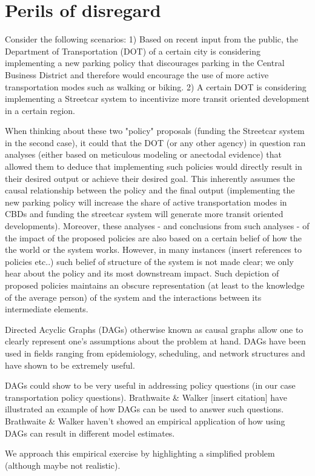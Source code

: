 \section{Perils of disregard}
Consider the following scenarios: 1) Based on recent input from the public, the Department of Transportation (DOT) of a certain city is considering implementing a new parking policy that discourages parking in the Central Business District and therefore would encourage the use of more active transportation modes such as walking or biking.
2) A certain DOT is considering implementing a Streetcar system to incentivize more transit oriented development in a certain region. 

When thinking about these two "policy" proposals (funding the Streetcar system in the second case), it could that the DOT (or any other agency) in question ran analyses (either based on meticulous modeling or anectodal evidence) that allowed them to deduce that implementing such policies would directly result in their desired output or achieve their desired goal.
This inherently assumes the causal relationship between the policy and the final output (implementing the new parking policy will increase the share of active transportation modes in CBDs and funding the streetcar system will generate more transit oriented developments).
Moreover, these analyses - and conclusions from such analyses - of the impact of the proposed policies are also based on a certain belief of how the the world or the system works. 
However, in many instances (insert references to policies etc..) such belief of structure of the system is not made clear; we only hear about the policy and its most downstream impact. 
Such depiction of proposed policies maintains an obscure representation (at least to the knowledge of the average person) of the system and the interactions between its intermediate elements.

Directed Acyclic Graphs (DAGs) otherwise known as causal graphs allow one to clearly represent one's assumptions about the problem at hand.
DAGs have been used in fields ranging from epidemiology, scheduling, and network structures and have shown to be extremely useful. 

DAGs could show to be very useful in addressing policy questions (in our case transportation policy questions).
Brathwaite & Walker [insert citation] have illustrated an example of how DAGs can be used to answer such questions.
Brathwaite & Walker haven't showed an empirical application of how using DAGs can result in different model estimates.

We approach this empirical exercise by highlighting a simplified problem (although maybe not realistic).

\blindtext[2]